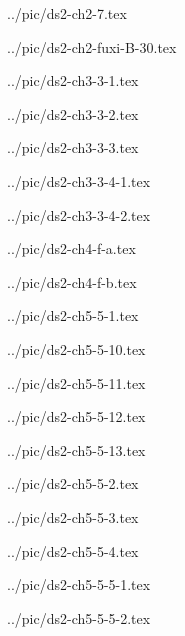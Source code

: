 

../pic/ds2-ch2-7.tex



../pic/ds2-ch2-fuxi-B-30.tex



../pic/ds2-ch3-3-1.tex



../pic/ds2-ch3-3-2.tex



../pic/ds2-ch3-3-3.tex



../pic/ds2-ch3-3-4-1.tex



../pic/ds2-ch3-3-4-2.tex



../pic/ds2-ch4-f-a.tex



../pic/ds2-ch4-f-b.tex



../pic/ds2-ch5-5-1.tex



../pic/ds2-ch5-5-10.tex



../pic/ds2-ch5-5-11.tex



../pic/ds2-ch5-5-12.tex



../pic/ds2-ch5-5-13.tex



../pic/ds2-ch5-5-2.tex



../pic/ds2-ch5-5-3.tex



../pic/ds2-ch5-5-4.tex



../pic/ds2-ch5-5-5-1.tex



../pic/ds2-ch5-5-5-2.tex

